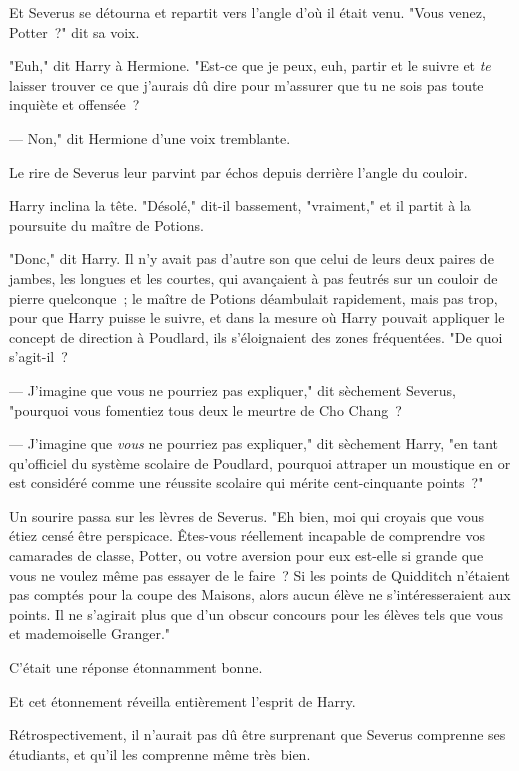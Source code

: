Et Severus se détourna et repartit vers l'angle d'où il était venu. "Vous venez, Potter~?" dit sa voix.

"Euh," dit Harry à Hermione. "Est-ce que je peux, euh, partir et le suivre et \emph{te} laisser trouver ce que j'aurais dû dire pour m'assurer que tu ne sois pas toute inquiète et offensée~?

--- Non," dit Hermione d'une voix tremblante.

Le rire de Severus leur parvint par échos depuis derrière l'angle du couloir.

Harry inclina la tête. "Désolé," dit-il bassement, "vraiment," et il partit à la poursuite du maître de Potions.

\later

"Donc," dit Harry. Il n'y avait pas d'autre son que celui de leurs deux paires de jambes, les longues et les courtes, qui avançaient à pas feutrés sur un couloir de pierre quelconque~; le maître de Potions déambulait rapidement, mais pas trop, pour que Harry puisse le suivre, et dans la mesure où Harry pouvait appliquer le concept de direction à Poudlard, ils s'éloignaient des zones fréquentées. "De quoi s'agit-il~?

--- J'imagine que vous ne pourriez pas expliquer," dit sèchement Severus, "pourquoi vous fomentiez tous deux le meurtre de Cho Chang~?

--- J'imagine que \emph{vous} ne pourriez pas expliquer," dit sèchement Harry, "en tant qu'officiel du système scolaire de Poudlard, pourquoi attraper un moustique en or est considéré comme une réussite scolaire qui mérite cent-cinquante points~?"

Un sourire passa sur les lèvres de Severus. "Eh bien, moi qui croyais que vous étiez censé être perspicace. Êtes-vous réellement incapable de comprendre vos camarades de classe, Potter, ou votre aversion pour eux est-elle si grande que vous ne voulez même pas essayer de le faire~? Si les points de Quidditch n'étaient pas comptés pour la coupe des Maisons, alors aucun élève ne s'intéresseraient aux points. Il ne s'agirait plus que d'un obscur concours pour les élèves tels que vous et mademoiselle Granger."

C'était une réponse étonnamment bonne.

Et cet étonnement réveilla entièrement l'esprit de Harry.

Rétrospectivement, il n'aurait pas dû être surprenant que Severus comprenne ses étudiants, et qu'il les comprenne même très bien.

